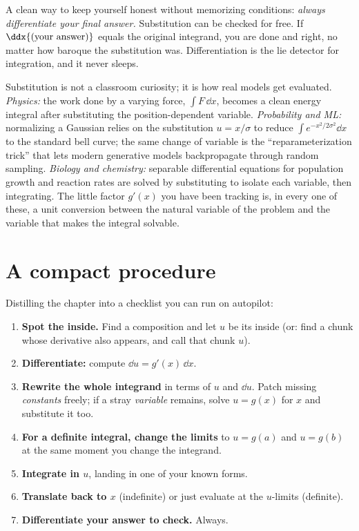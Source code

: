 \begin{intuitionbox}
A clean way to keep yourself honest without memorizing conditions: \emph{always
differentiate your final answer.} Substitution can be checked for free. If
$\ddx{(\text{your answer})}$ equals the original integrand, you are done and right,
no matter how baroque the substitution was. Differentiation is the lie detector for
integration, and it never sleeps.
\end{intuitionbox}

\begin{applicationbox}
Substitution is not a classroom curiosity; it is how real models get evaluated.
\emph{Physics:} the work done by a varying force, $\int F\,\dd x$, becomes a clean
energy integral after substituting the position-dependent variable. \emph{Probability
and ML:} normalizing a Gaussian relies on the substitution $u = x/\sigma$ to reduce
$\int e^{-x^2/2\sigma^2}\dd x$ to the standard bell curve; the same change of
variable is the ``reparameterization trick'' that lets modern generative models
backpropagate through random sampling. \emph{Biology and chemistry:} separable
differential equations for population growth and reaction rates are solved by
substituting to isolate each variable, then integrating. The little factor $g'(x)$
you have been tracking is, in every one of these, a unit conversion between the
natural variable of the problem and the variable that makes the integral solvable.
\end{applicationbox}

\section{A compact procedure}
\label{ch22:procedure}

Distilling the chapter into a checklist you can run on autopilot:

\begin{enumerate}
\item \textbf{Spot the inside.} Find a composition and let $u$ be its inside (or:
find a chunk whose derivative also appears, and call that chunk $u$).
\item \textbf{Differentiate:} compute $\dd u = g'(x)\,\dd x$.
\item \textbf{Rewrite the whole integrand} in terms of $u$ and $\dd u$. Patch
missing \emph{constants} freely; if a stray \emph{variable} remains, solve $u=g(x)$
for $x$ and substitute it too.
\item \textbf{For a definite integral, change the limits} to $u=g(a)$ and
$u=g(b)$ at the same moment you change the integrand.
\item \textbf{Integrate in $u$}, landing in one of your known forms.
\item \textbf{Translate back to $x$} (indefinite) or just evaluate at the
$u$-limits (definite).
\item \textbf{Differentiate your answer to check.} Always.
\end{enumerate}

